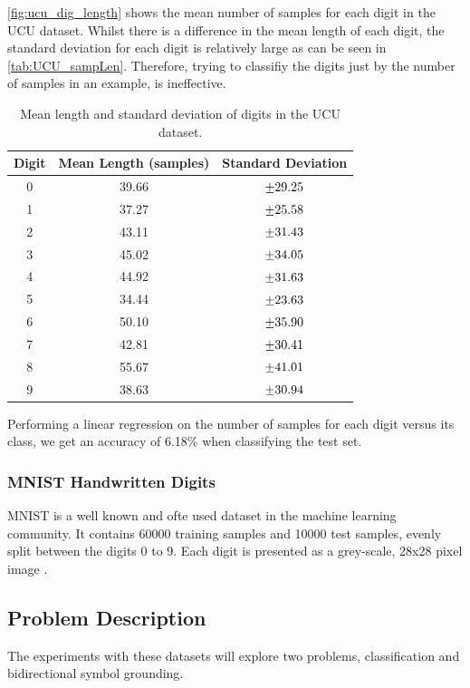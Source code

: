 \autoref{fig:ucu_dig_length} shows the mean number of samples for each digit in the UCU dataset. Whilst there is a difference in the mean length of each digit, the standard deviation for each digit is relatively large as can be seen in \autoref{tab:UCU_sampLen}. Therefore, trying to classifiy the digits just by the number of samples in an example, is ineffective.

	\begin{table}
		\centering
		\begin{tabular}{|c|c|c|}
			\hline
			Digit & Mean Length (samples) & Standard Deviation \\ \hline
			0 & 39.66 & $\mypm 29.25$ \\ \hline
			1 & 37.27 & $\mypm 25.58$ \\ \hline
			2 & 43.11 & $\mypm 31.43$ \\ \hline
			3 & 45.02 & $\mypm 34.05$ \\ \hline
			4 & 44.92 & $\mypm 31.63$ \\ \hline
			5 & 34.44 & $\mypm 23.63$ \\ \hline
			6 & 50.10 & $\mypm 35.90$ \\ \hline
			7 & 42.81 & $\mypm 30.41$ \\ \hline
			8 & 55.67 & $\mypm 41.01$ \\ \hline
			9 & 38.63 & $\mypm 30.94$ \\ \hline

		\end{tabular}
		\caption{Mean length and standard deviation of digits in the UCU dataset.}
		\label{tab:UCU_sampLen}
	\end{table}


Performing a linear regression on the number of samples for each digit versus its class, we get an accuracy of 6.18\% when classifying the test set.

\subsubsection{MNIST Handwritten Digits}
MNIST is a well known and ofte used dataset in the machine learning community. It contains 60000 training samples and 10000 test samples, evenly split between the digits 0 to 9. 
Each digit is presented as a grey-scale, 28x28 pixel image \cite{lecun1998mnist}. 

\subsection{Problem Description}
The experiments with these datasets will explore two problems, classification and bidirectional symbol grounding. 

